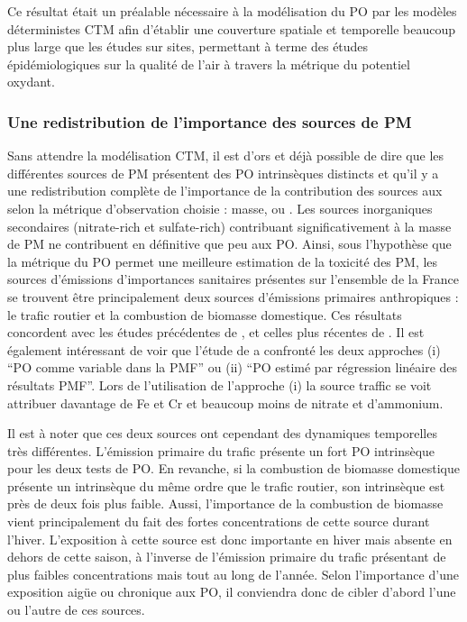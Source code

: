 Ce résultat était un préalable nécessaire à la modélisation du PO par les modèles
déterministes CTM afin d'établir une couverture spatiale et temporelle beaucoup plus
large que les études sur sites, permettant à terme des études épidémiologiques sur la
qualité de l'air à travers la métrique du potentiel oxydant.

\subsubsection{Une redistribution de l'importance des sources de PM}%
\label{ssub:une_redistribution_de_l_importance_des_sources_de_pm}

Sans attendre la modélisation CTM, il est d'ors et déjà possible de dire que les
différentes sources de PM présentent des PO intrinsèques distincts et qu'il y a une
redistribution complète de l'importance de la contribution des sources aux \PMdix{} selon
la métrique d'observation choisie : masse, \POAAv{} ou \PODTTv. Les sources inorganiques
secondaires (nitrate-rich et sulfate-rich) contribuant significativement à la masse de PM
ne contribuent en définitive que peu aux PO. Ainsi, sous l'hypothèse que la métrique du PO
permet une meilleure estimation de la toxicité des PM, les sources d'émissions
d'importances sanitaires présentes sur l'ensemble de la France se trouvent être
principalement deux sources d'émissions primaires anthropiques : le trafic routier et la
combustion de biomasse domestique. Ces résultats concordent avec les études précédentes de
\cite{batesReactive2015,fangOxidative2016}, et celles plus récentes de
\cite{paraskevopoulouYearlong2019,cesariSource2019}. Il est également intéressant de voir
que l'étude de \cite{cesariSource2019} a confronté les deux approches (i) ``PO comme
variable dans la PMF'' ou (ii) ``PO estimé par régression linéaire des résultats PMF''.
Lors de l'utilisation de l'approche (i) la source traffic se voit attribuer davantage de Fe
et Cr et beaucoup moins de nitrate et d'ammonium.

Il est à noter que ces deux sources ont cependant des dynamiques temporelles très différentes. L'émission
primaire du trafic présente un fort PO intrinsèque pour les deux tests de PO.
En revanche, si la combustion de biomasse domestique présente un \POAA{} intrinsèque du
même ordre que le trafic routier, son \PODTT{} intrinsèque est près de deux fois plus
faible. Aussi, l'importance de la combustion de biomasse vient principalement du fait des
fortes concentrations de cette source durant l'hiver. L'exposition à cette source est donc
importante en hiver mais absente en dehors de cette saison, à l'inverse de l'émission
primaire du trafic présentant de plus faibles concentrations mais tout au long de l'année.
Selon l'importance d'une exposition aigüe ou chronique aux PO, il conviendra donc de
cibler d'abord l'une ou l'autre de ces sources.

